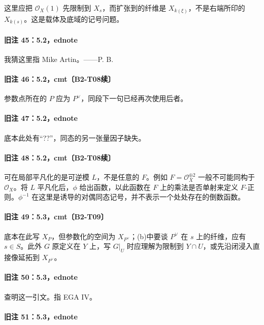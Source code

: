 \documentclass[UTF8,a4paper]{ctexbook}
\newcommand{\OO}{\mathscr O}
\begin{document}
这里应把 $\OO_X(1)$ 先限制到 $X_s$，而扩张到的纤维是 $X_{k(\xi)}$，不是右端所印的 $X_{k(s)}$。这是载体及底域的记号问题。

\paragraph{旧注 45：5.2，ednote}

我猜这里指 Mike Artin。——P. B.

\paragraph{旧注 46：5.2，cmt〔B2-T08续〕}

参数点所在的 $P$ 应为 $P^\vee$，同段下一句已经再次使用后者。

\paragraph{旧注 47：5.2，ednote}

底本此处有“??”，同态的另一张量因子缺失。

\paragraph{旧注 48：5.2，cmt〔B2-T08续〕}

可在局部平凡化的是可逆模 $L$，不是任意的 $F$。例如 $F=\OO_X^{\oplus2}$ 一般不可能同构于 $\OO_X$。将 $L$ 平凡化后，$\phi$ 给出函数，以此函数在 $F$ 上的乘法是否单射来定义 $F$-正则。$\phi^{-1}$ 在这里是诱导的对偶同态记号，并不表示一个处处存在的倒数函数。

\paragraph{旧注 49：5.3，cmt〔B2-T09〕}

底本在此写 $X_P$，但参数化的空间为 $X_{P^\vee}$；(b)中要谈 $P^\vee$ 在 $s$ 上的纤维，应有 $s\in S$。此外 $G$ 原定义在 $Y$ 上，写 $G|_U$ 时应理解为限制到 $Y\cap U$，或先沿闭浸入直接像延拓到 $X_{P^\vee}$。

\paragraph{旧注 50：5.3，ednote}

查明这一引文。指 EGA IV。

\paragraph{旧注 51：5.3，ednote}
\end{document}
